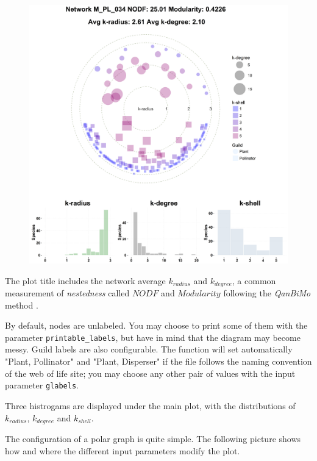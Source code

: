\documentclass[12pt]{article}
\begin{document}
\begin{figure}[h!]
\centering
\includegraphics[scale=0.4]{M_PL_034_polar.png}
\label{fig:M_PL_034_polar}
\end{figure}

The plot title includes the network average ${k}_{radius}$ and ${k}_{degree}$, a common measurement of \textit{nestedness} called $NODF$ \cite{almeida2008consistent} and $Modularity$ following the \textit{QanBiMo} method \cite{dormann2014method}.

By default, nodes are unlabeled. You may choose to print some of them with the parameter \texttt{printable\_labels}, but have in mind that the
diagram may become messy. Guild labels are also configurable. The function will set automatically "Plant, Pollinator" and "Plant, Disperser" if the
file follows the naming convention of the web of life site; you may choose any other pair of values with the input parameter \texttt{glabels}.

Three histrogams are displayed under the main plot, with the distributions of $k_{radius}$, $k_{degree}$ and $k_{shell}$. 

The configuration of a polar graph is quite simple. The following picture shows how and where the different input parameters modify the plot.
\end{document}
